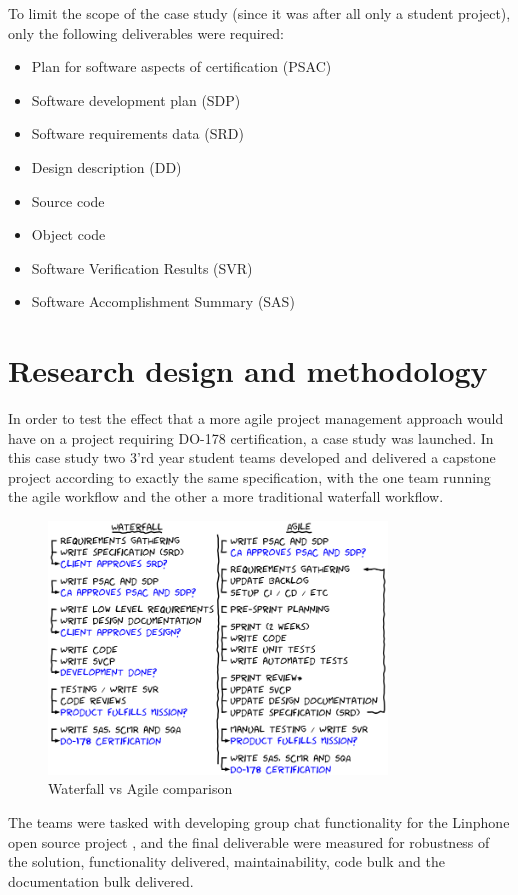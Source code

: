 \documentclass{sig-alternate-05-2015}
\begin{document}
To limit the scope of the case study (since it was after all only a student project), only the following deliverables were required:
\begin{itemize}
	\item Plan for software aspects of certification (PSAC)
	\item Software development plan (SDP)
	\item Software requirements data (SRD)
	\item Design description (DD)
	\item Source code
	\item Object code
	\item Software Verification Results (SVR)
	\item Software Accomplishment Summary (SAS)
\end{itemize}

\section{Research design and methodology}

In order to test the effect that a more agile project management approach would have on a project requiring DO-178 certification, a case study was launched. In this case study two 3'rd year student teams developed and delivered a capstone project according to exactly the same specification, with the one team running the agile workflow and the other a more traditional waterfall workflow.  

\begin{figure}[t!]
	\centering 
	\includegraphics[width=90mm]{agileWaterfallTeamActivities.png}
	\caption{Waterfall vs Agile comparison}
\end{figure}

The teams were tasked with developing group chat functionality for the Linphone open source project \cite{Linphone_2015}, and the final deliverable were measured for robustness of the solution, functionality delivered, maintainability, code bulk and the documentation bulk delivered.
\end{document}
